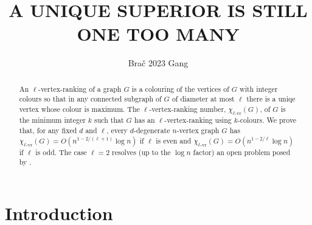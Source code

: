 \documentclass{patmorin}
\title{\MakeUppercase{A Unique Superior is Still One Too Many}}
\author{Bra\v{c} 2023 Gang}
\newcommand{\defin}[1]{\emph{\color{brightmaroon}#1}}
\newcommand{\rn}[1]{\chi_{\operatorname{#1-vr}}}
\newcommand{\trn}{\chi_{\mathrm{us}}}
\newcommand{\lrn}{\rn{\ell}}
\begin{document}
\maketitle

\begin{abstract}
  An $\ell$-vertex-ranking of a graph $G$ is a colouring of the vertices of $G$ with integer colours so that in any connected subgraph of $G$ of diameter at most $\ell$ there is a uniqe vertex whose colour is maximum.  The $\ell$-vertex-ranking number, $\lrn(G)$, of $G$ is the minimum integer $k$ such that $G$ has an $\ell$-vertex-ranking using $k$-colours.  We prove that, for any fixed $d$ and $\ell$, every $d$-degenerate $n$-vertex graph $G$ has $\lrn(G)=O(n^{1-2/(\ell+1)}\log n)$ if $\ell$ is even and $\lrn(G)=O(n^{1-2/\ell}\log n)$ if $\ell$ is odd. The case $\ell=2$ resolves (up to the $\log n$ factor) an open problem posed by \citet{karpas.neiman.ea:on}.
\end{abstract}


%



\section{Introduction}
\end{document}
